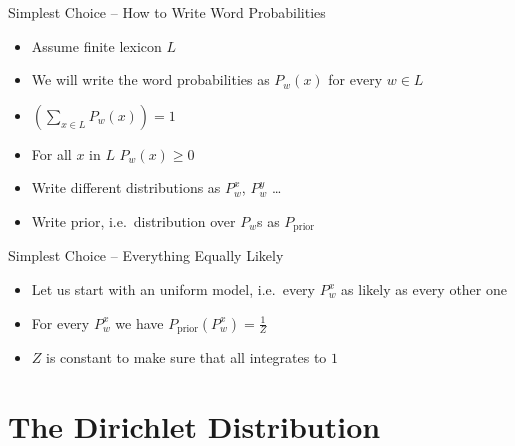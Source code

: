 \documentclass[11pt]{beamer}
\begin{document}
	\begin{frame}{Simplest Choice -- How to Write Word Probabilities}
		\begin{itemize}
			\item Assume finite lexicon $L$
			\item We will write the word probabilities as $P_w(x)$ for every $w \in L$
			\item $\left( \sum_{x \in L} P_w(x) \right) = 1$
			\item For all $x$ in $L$ $P_w(x) \geq 0$
			\item Write different distributions as $P_{w}^{x}$, $P_{w}^{y}$ \dots
			\item Write prior, i.e.\ distribution over $P_{w}$s as $P_{\text{prior}}$
		\end{itemize}
	\end{frame}
	
	\begin{frame}{Simplest Choice -- Everything Equally Likely}
		\begin{itemize}
			\item Let us start with an uniform model, i.e.\ every $P^{x}_{w}$ as likely as every other one
			\item For every $P^{x}_{w}$ we have $P_{\text{prior}}(P^{x}_{w}) = \frac{1}{Z}$
			\item $Z$ is constant to make sure that all integrates to $1$
		\end{itemize}
	\end{frame}
	
	\section{The Dirichlet Distribution}
	
\end{document}
